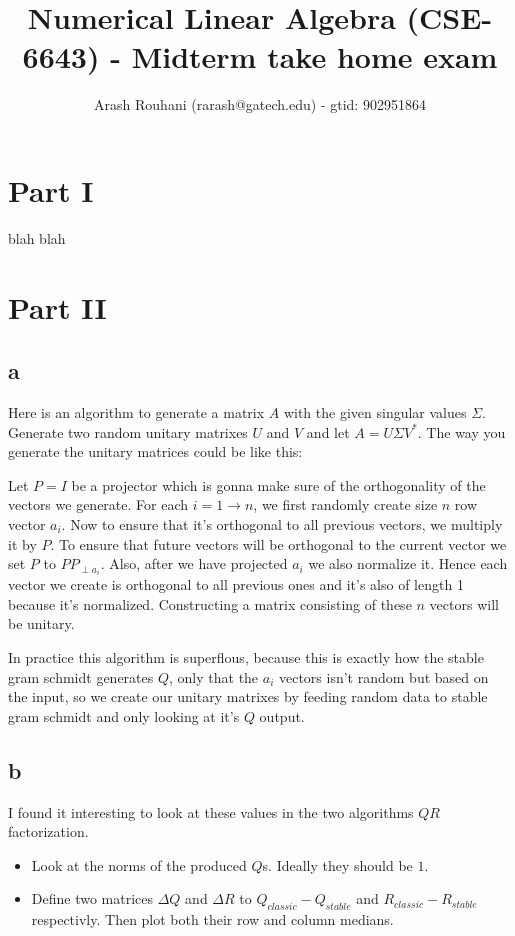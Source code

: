 \documentclass[a4paper,11pt]{article}
\title{Numerical Linear Algebra (CSE-6643) - Midterm take home exam}
\author{Arash Rouhani (rarash@gatech.edu) - gtid: 902951864}
\begin{document}
\maketitle

\section{Part I}

blah blah

\section{Part II}

\subsection{a}

Here is an algorithm to generate a matrix $A$ with the given singular values
$\Sigma$. Generate two random unitary matrixes $U$ and $V$ and let $A = U
\Sigma V^*$. The way you generate the unitary matrices could be like this:

Let $P=I$ be a projector which is gonna make sure of the orthogonality of the
vectors we generate. For each $i=1 \to n$, we first randomly create size $n$
row vector $a_i$. Now to ensure that it's orthogonal to all previous vectors,
we multiply it by $P$. To ensure that future vectors will be orthogonal to the
current vector we set $P$ to $P P_{\perp a_i}$. Also, after we have projected
$a_i$ we also normalize it. Hence each vector we create is orthogonal to all
previous ones and it's also of length 1 because it's normalized. Constructing
a matrix consisting of these $n$ vectors will be unitary.

In practice this algorithm is superflous, because this is exactly
how the stable gram schmidt generates $Q$, only that the $a_i$ vectors isn't
random but based on the input, so we create our unitary matrixes by feeding
random data to stable gram schmidt and only looking at it's $Q$ output.

\subsection{b}

I found it interesting to look at these values in the two algorithms $QR$
factorization.

\begin{itemize}
  \item Look at the norms of the produced $Q$s. Ideally they should be $1$.
  \item Define two matrices $\Delta Q$ and $\Delta R$ to $Q_{classic} -
    Q_{stable}$ and $R_{classic} - R_{stable}$ respectivly. Then plot both
    their row and column medians.

\end{itemize}
\end{document}
